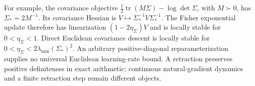 For example, the covariance objective $\tfrac12\operatorname{tr}(M\Sigma)-\log\det\Sigma$, with $M\succ0$, has $\Sigma_*=2M^{-1}$. Its covariance Hessian is $V\mapsto\Sigma_*^{-1}V\Sigma_*^{-1}$. The Fisher exponential update therefore has linearization $(1-2\eta_\Sigma)V$ and is locally stable for $0<\eta_\Sigma<1$. Direct Euclidean covariance descent is locally stable for $0<\eta_\Sigma<2\lambda_{\min}(\Sigma_*)^2$. An arbitrary positive-diagonal reparameterization supplies no universal Euclidean learning-rate bound. A retraction preserves positive definiteness in exact arithmetic; continuous natural-gradient dynamics and a finite retraction step remain different objects.
